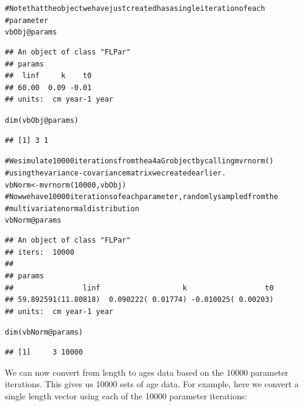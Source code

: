 \documentclass[a4paper,english,10pt]{article}\usepackage[]{graphicx}\usepackage[]{color}
\makeatletter
\newcommand{\hlnum}[1]{\textcolor[rgb]{0.063,0.58,0.627}{#1}}%
\newcommand{\hlcom}[1]{\textcolor[rgb]{0.588,0.588,0.588}{#1}}%
\newcommand{\hlopt}[1]{\textcolor[rgb]{0.196,0.196,0.196}{#1}}%
\newcommand{\hlstd}[1]{\textcolor[rgb]{0.196,0.196,0.196}{#1}}%
\newcommand{\hlkwb}[1]{\textcolor[rgb]{0.627,0,0.314}{#1}}%
\newcommand{\hlkwc}[1]{\textcolor[rgb]{0,0.631,0.314}{#1}}%
\newcommand{\hlkwd}[1]{\textcolor[rgb]{0.78,0.227,0.412}{#1}}%
\newenvironment{kframe}{%
 \def\at@end@of@kframe{}%
 \ifinner\ifhmode%
  \def\at@end@of@kframe{\end{minipage}}%
  \begin{minipage}{\columnwidth}%
 \fi\fi%
 \def\FrameCommand##1{\hskip\@totalleftmargin \hskip-\fboxsep
 \colorbox{shadecolor}{##1}\hskip-\fboxsep
     \hskip-\linewidth \hskip-\@totalleftmargin \hskip\columnwidth}%
 \MakeFramed {\advance\hsize-\width
   \@totalleftmargin\z@ \linewidth\hsize
   \@setminipage}}%
 {\par\unskip\endMakeFramed%
 \at@end@of@kframe}
\newenvironment{knitrout}{}{} %
\makeatother
\begin{document}
\begin{knitrout}
\color{fgcolor}\begin{kframe}
\begin{alltt}
\hlcom{# Note that the object we have just created has a single iteration of each}
\hlcom{# parameter}
\hlstd{vbObj}\hlopt{@}\hlkwc{params}
\end{alltt}
\begin{verbatim}
## An object of class "FLPar"
## params
##  linf     k    t0 
## 60.00  0.09 -0.01 
## units:  cm year-1 year
\end{verbatim}
\begin{alltt}
\hlkwd{dim}\hlstd{(vbObj}\hlopt{@}\hlkwc{params}\hlstd{)}
\end{alltt}
\begin{verbatim}
## [1] 3 1
\end{verbatim}
\begin{alltt}
\hlcom{# We simulate 10000 iterations from the a4aGr object by calling mvrnorm()}
\hlcom{# using the variance-covariance matrix we created earlier.}
\hlstd{vbNorm} \hlkwb{<-} \hlkwd{mvrnorm}\hlstd{(}\hlnum{10000}\hlstd{, vbObj)}
\hlcom{# Now we have 10000 iterations of each parameter, randomly sampled from the}
\hlcom{# multivariate normal distribution}
\hlstd{vbNorm}\hlopt{@}\hlkwc{params}
\end{alltt}
\begin{verbatim}
## An object of class "FLPar"
## iters:  10000 
## 
## params
##                linf                   k                  t0 
## 59.892591(11.80818)  0.090222( 0.01774) -0.010025( 0.00203) 
## units:  cm year-1 year
\end{verbatim}
\begin{alltt}
\hlkwd{dim}\hlstd{(vbNorm}\hlopt{@}\hlkwc{params}\hlstd{)}
\end{alltt}
\begin{verbatim}
## [1]     3 10000
\end{verbatim}
\end{kframe}
\end{knitrout}

We can now convert from length to ages data based on the 10000 parameter iterations. This gives us 10000 sets of age data. For example, here we convert a single length vector using each of the 10000 parameter iterations: 
\end{document}
